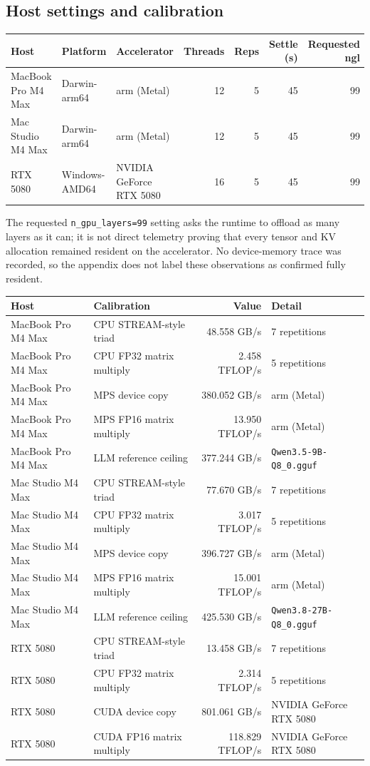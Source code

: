 \documentclass[10pt]{article}
\begin{document}
\subsection{Host settings and calibration}
\begin{center}
\small
\begin{tabular}{lllrrrr}
\toprule
Host & Platform & Accelerator & Threads & Reps & Settle (s) & Requested ngl\\
\midrule
MacBook Pro M4 Max & Darwin-arm64 & arm (Metal) & 12 & 5 & 45 & 99 \\
Mac Studio M4 Max & Darwin-arm64 & arm (Metal) & 12 & 5 & 45 & 99 \\
RTX 5080 & Windows-AMD64 & NVIDIA GeForce RTX 5080 & 16 & 5 & 45 & 99 \\
\bottomrule
\end{tabular}
\end{center}
The requested \texttt{n\_gpu\_layers=99} setting asks the runtime to offload as many layers as it can; it is not direct telemetry proving that every tensor and KV allocation remained resident on the accelerator. No device-memory trace was recorded, so the appendix does not label these observations as confirmed fully resident.
\begin{center}
\small
\begin{tabular}{llrl}
\toprule
Host & Calibration & Value & Detail\\
\midrule
MacBook Pro M4 Max & CPU STREAM-style triad & 48.558 GB/s & 7 repetitions \\
MacBook Pro M4 Max & CPU FP32 matrix multiply & 2.458 TFLOP/s & 5 repetitions \\
MacBook Pro M4 Max & MPS device copy & 380.052 GB/s & arm (Metal) \\
MacBook Pro M4 Max & MPS FP16 matrix multiply & 13.950 TFLOP/s & arm (Metal) \\
MacBook Pro M4 Max & LLM reference ceiling & 377.244 GB/s & \nolinkurl{Qwen3.5-9B-Q8_0.gguf} \\
Mac Studio M4 Max & CPU STREAM-style triad & 77.670 GB/s & 7 repetitions \\
Mac Studio M4 Max & CPU FP32 matrix multiply & 3.017 TFLOP/s & 5 repetitions \\
Mac Studio M4 Max & MPS device copy & 396.727 GB/s & arm (Metal) \\
Mac Studio M4 Max & MPS FP16 matrix multiply & 15.001 TFLOP/s & arm (Metal) \\
Mac Studio M4 Max & LLM reference ceiling & 425.530 GB/s & \nolinkurl{Qwen3.8-27B-Q8_0.gguf} \\
RTX 5080 & CPU STREAM-style triad & 13.458 GB/s & 7 repetitions \\
RTX 5080 & CPU FP32 matrix multiply & 2.314 TFLOP/s & 5 repetitions \\
RTX 5080 & CUDA device copy & 801.061 GB/s & NVIDIA GeForce RTX 5080 \\
RTX 5080 & CUDA FP16 matrix multiply & 118.829 TFLOP/s & NVIDIA GeForce RTX 5080 \\
\bottomrule
\end{tabular}
\end{center}
\end{document}
